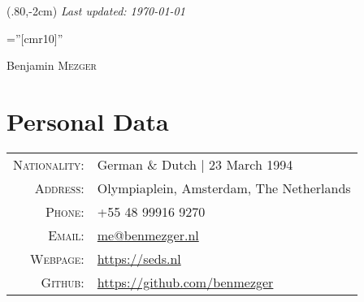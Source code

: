 \documentclass[a4paper,10pt]{article}
\begin{document}
\begin{textblock*}{100mm}(.80\textwidth,-2cm)
{\color{gray!50} \textit{Last updated: \today}}
\end{textblock*}


\pagestyle{empty} %

\font\fb=''[cmr10]'' %

\par{\centering
		{\Huge Benjamin \textsc{Mezger}
	}\bigskip\par}

\section{Personal Data}

\begin{tabular}{rp{12cm}}
    \textsc{Nationality:} & German \& Dutch  | 23 March 1994 \\
    \textsc{Address:}     & Olympiaplein, Amsterdam, The Netherlands \\
    \textsc{Phone:}       & +55 48 99916 9270 \\
    \textsc{Email:}       & \href{mailto:me@benmezger.nl}{me@benmezger.nl} \\
    \textsc{Webpage:}     & \url{https://seds.nl} \\
    \textsc{Github:}      & \url{https://github.com/benmezger}
\end{tabular}

\end{document}
